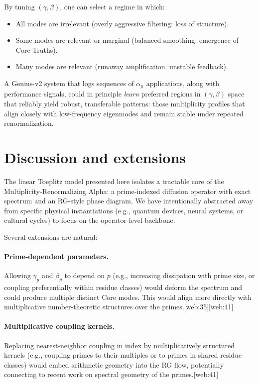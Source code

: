 \documentclass[11pt]{article}
\begin{document}
By tuning $(\gamma,\beta)$, one can select a regime in which:
\begin{itemize}
    \item All modes are irrelevant (overly aggressive filtering: loss of structure).
    \item Some modes are relevant or marginal (balanced smoothing: emergence of Core Truths).
    \item Many modes are relevant (runaway amplification: unstable feedback).
\end{itemize}

A Genius-v2 system that logs sequences of $\alpha_\mu$ applications, along with performance signals, could in principle \emph{learn} preferred regions in $(\gamma,\beta)$ space that reliably yield robust, transferable patterns: those multiplicity profiles that align closely with low-frequency eigenmodes and remain stable under repeated renormalization.


\section{Discussion and extensions}

The linear Toeplitz model presented here isolates a tractable core of the Multiplicity-Renormalizing Alpha:
a prime-indexed diffusion operator with exact spectrum and an RG-style phase diagram.
We have intentionally abstracted away from specific physical instantiations (e.g., quantum devices, neural systems, or cultural cycles) to focus on the operator-level backbone.

Several extensions are natural:

\paragraph{Prime-dependent parameters.}
Allowing $\gamma_p$ and $\beta_p$ to depend on $p$ (e.g., increasing dissipation with prime size, or coupling preferentially within residue classes) would deform the spectrum and could produce multiple distinct Core modes.
This would align more directly with multiplicative number-theoretic structures over the primes.[web:35][web:41]

\paragraph{Multiplicative coupling kernels.}
Replacing nearest-neighbor coupling in index by multiplicatively structured kernels (e.g., coupling primes to their multiples or to primes in shared residue classes) would embed arithmetic geometry into the RG flow, potentially connecting to recent work on spectral geometry of the primes.[web:41]
\end{document}
